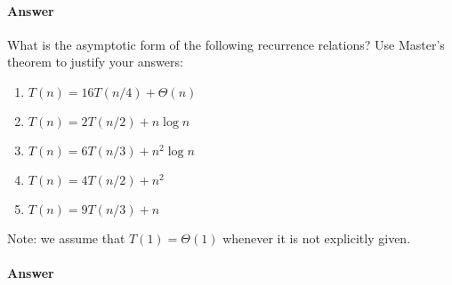 \documentclass{article}
\begin{document}
\paragraph{Answer}



\collab{\todo{}}

What is the asymptotic form of the following recurrence relations?  Use Master's
theorem to justify your answers:
\begin{enumerate}
    \item $T(n) = 16 T(n/4) + \Theta(n)$
    \item $T(n) = 2 T(n/2) + n \log{n}$
    \item $T(n) = 6 T(n/3) + n^2 \log{n}$
    \item $T(n) = 4 T(n/2) + n^2$
    \item $T(n) = 9 T(n/3) + n$
\end{enumerate}
Note: we assume that $T(1)=\Theta(1)$ whenever it is not explicitly given.

\paragraph{Answer}

\end{document}
